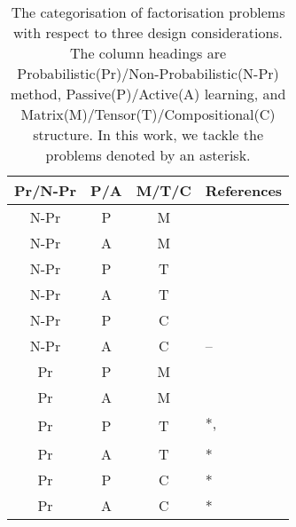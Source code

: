 
\begin{table}[t]
\centering
\caption{\label{tbl:relatedwork}The categorisation of factorisation problems with respect to 
three design considerations. The column headings are Probabilistic(Pr)/Non-Probabilistic(N-Pr) method, Passive(P)/Active(A) learning, and Matrix(M)/Tensor(T)/Compositional(C) structure. In this work, we tackle the problems denoted by an asterisk.}
\vskip 0.15in
\begin{tabular}{c c c l}
Pr/N-Pr & P/A & M/T/C & References	\\ \hline \hline

N-Pr & P & M & \cite{lee1999learning}\\ \hline
N-Pr & A & M & \cite{ruchansky2015matrix}\\  \hline

\multirow{2}{*}{N-Pr} & \multirow{2}{*}{P} & \multirow{2}{*}{T}& \cite{nickel2011three}\\
& & & \cite{kolda2009tensor}\\ \hline
N-Pr & A & T & \cite{kajino2015active} \\  \hline

\multirow{2}{*}{N-Pr} & \multirow{2}{*}{P} & \multirow{2}{*}{C} & \cite{Neelakantan2015} \\ 
& & & \cite{guu2015traversing}\\ \hline

N-Pr & A & C & -- \\ \hline

Pr & P & M & \cite{mnih2007probabilistic}\\ \hline

\multirow{2}{*}{Pr} & \multirow{2}{*}{A} & \multirow{2}{*}{M}&  \cite{kawale2015efficient} \\
& & & \cite{sutherland2013active}\\ \hline

\multirow{2}{*}{Pr} & \multirow{2}{*}{P} & \multirow{2}{*}{T}& *, \cite{xiong2010temporal}\\
& & & \cite{schmidt2009probabilistic} \\ \hline

Pr & A & T & * \\ \hline

Pr & P & C & * \\ \hline

Pr & A & C & * \\ 
\end{tabular}
\end{table}